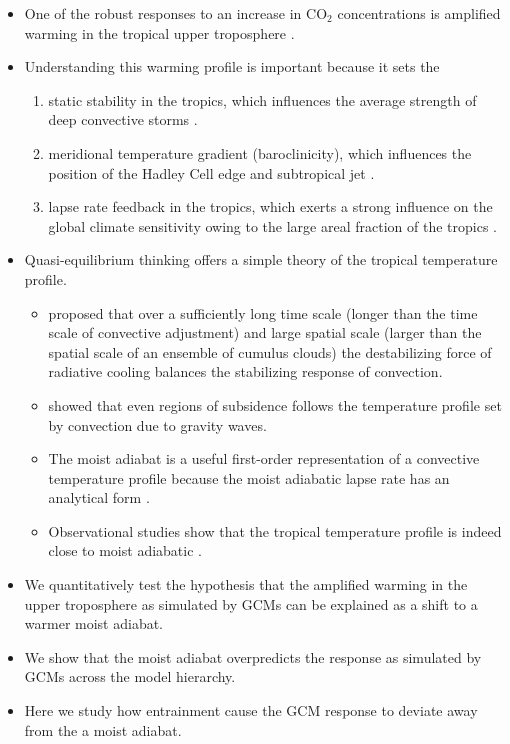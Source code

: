 \documentclass[draft]{agujournal2019}
\begin{document}
\begin{itemize}

\item One of the robust responses to an increase in CO$_2$ concentrations is amplified warming in the tropical upper troposphere \cite{vallis-et-al-2015}. 

\item Understanding this warming profile is important because it sets the
\begin{enumerate}
\item static stability in the tropics, which influences the average strength of deep convective storms \cite{seeley-romps-2015}.
\item meridional temperature gradient (baroclinicity), which influences the position of the Hadley Cell edge and subtropical jet \cite{shaw-et-al-2016}.
\item lapse rate feedback in the tropics, which exerts a strong influence on the global climate sensitivity owing to the large areal fraction of the tropics \cite{po-chedley-et-al-2018}.
\end{enumerate}

\item Quasi-equilibrium thinking offers a simple theory of the tropical temperature profile.
\begin{itemize}
\item {} proposed that over a sufficiently long time scale (longer than the time scale of convective adjustment) and large spatial scale (larger than the spatial scale of an ensemble of cumulus clouds) the destabilizing force of radiative cooling balances the stabilizing response of convection.
\item {} showed that even regions of subsidence follows the temperature profile set by convection due to gravity waves. 
\item The moist adiabat is a useful first-order representation of a convective temperature profile because the moist adiabatic lapse rate has an analytical form \cite{emanuel-1994}.
\item Observational studies show that the tropical temperature profile is indeed close to moist adiabatic \cite{betts-1982, xu-emanuel-1989}.
\end{itemize}

\item We quantitatively test the hypothesis that the amplified warming in the upper troposphere as simulated by GCMs can be explained as a shift to a warmer moist adiabat.

\item We show that the moist adiabat overpredicts the response as simulated by GCMs across the model hierarchy.

\item Here we study how entrainment cause the GCM response to deviate away from the a moist adiabat.

\end{itemize}
\end{document}
